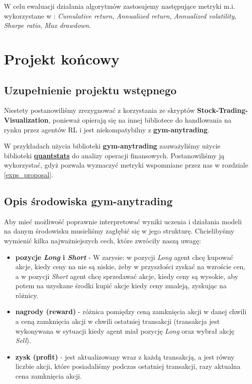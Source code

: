 \documentclass[12pt,a4paper]{article}
\begin{document}
\label{metrics}
W celu ewaluacji działania algorytmów zastosujemy następujące metryki
m.i. wykorzystane w \cite{ensemble_strat}: \emph{Cumulative return},
\emph{Annualized return}, \emph{Annualized volatility}, \emph{Sharpe ratio},
\emph{Max drawdown}.

\pagebreak
\section{Projekt końcowy}

\subsection{Uzupełnienie projektu wstępnego}

Niestety postanowiliśmy zrezygnować z korzystania ze skryptów \textbf{Stock-Trading-Visualization},
ponieważ opierają się na innej bibliotece do handlowania na rynku przez
agentów RL i jest niekompatybilny z \textbf{gym-anytrading}.

W przykładach użycia biblioteki \textbf{gym-anytrading} zauważyliśmy
użycie biblioteki
\textbf{\href{https://github.com/ranaroussi/quantstats}{quantstats}}
do analizy operacji finansowych. Postanowiliśmy ją wykorzystać, gdyż
pozwala wyznaczyć metryki wspomniane przez nas w rozdziale
\ref{exps_proposal}.

\subsection{Opis środowiska gym-anytrading}

Aby mieć możliwość poprawnie interpretować wyniki uczenia i działania
modeli na danym środowisku musieliśmy zagłębić się w jego strukturę.
Chcielibyśmy wymienić kilka najważniejszych cech, które zwróciły naszą
uwagę:

\begin{itemize}
  \item \textbf{pozycje \emph{Long} i \emph{Short}} -
        W zarysie: w pozycji \emph{Long} agent chcę kupować akcje, kiedy
        ceny na nie są niskie, żeby w przyszłości zyskać na wzroście cen,
        a w pozycji \emph{Short} agent chcę sprzedawać akcje, kiedy ceny
        są wysokie, aby potem na uzyskane środki kupić akcje kiedy ceny
        zmaleją, zyskując na różnicy.
  \item \textbf{nagrody (reward)} - różnica pomiędzy ceną zamknięcia akcji w danej
        chwili a ceną zamknięcia akcji w chwili ostatniej transakcji
        (transakcja jest wykonywana w sytuacji kiedy agent miał pozycję
        \emph{Long} oraz wybrał akcję \emph{Sell}).
  \item \textbf{zysk (profit)} - jest aktualizowany wraz z każdą
        transakcją, a jest równy liczbie akcji, które posiadaliśmy podczas
        ostatniej transakcji, razy aktualna cena zamknięcia akcji.

\end{itemize}
\end{document}

